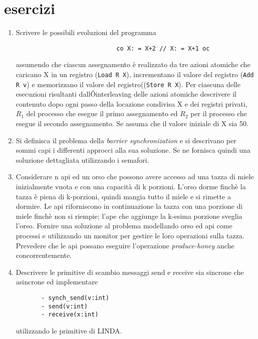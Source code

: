 \chapter{esercizi}

\begin{enumerate}
\medskip
\item 
Scrivere le possibili evoluzioni del programma 
\begin{verbatim}
                       		co X: = X+2 // X: = X+1 oc
\end{verbatim}
assumendo che ciascun assegnamento è realizzato da tre azioni atomiche che
caricano X in un registro (\verb"Load R X"), incrementano il valore del registro (\verb"Add R v") e memorizzano il valore del registro((\verb"Store R X"). Per ciascuna delle esecuzioni risultanti dallÕinterleaving delle azioni atomiche descrivere il contenuto dopo ogni passo della locazione condivisa X e dei registri privati,  $R_1$ del processo che esegue il primo assegnamento ed  $R_2$  per il processo che esegue il secondo assegnamento. Se assuma che il valore iniziale di X sia 50.
\medskip
\item
Si definisca il problema della \emph{barrier synchronization} e si descrivano per sommi capi i differenti approcci alla sua soluzione. Se ne fornisca quindi una soluzione dettagliata utilizzando i semafori.
\medskip
\item
Considerare n api ed un orso che possono avere accesso ad una tazza di miele
inizialmente  vuota e con una capacità di k porzioni. L'orso dorme finchè la
tazza è piena di k-porzioni,  quindi mangia tutto il miele e si rimette a
dormire. Le api riforniscono in continuazione la  tazza con una porzione di
miele finchè non si riempie; l'ape che aggiunge la k-esima porzione sveglia
l'orso. Fornire una soluzione al problema modellando orso ed api come  processi
e utilizzando un monitor per gestire le loro operazioni sulla tazza. Prevedere che le api possano eseguire l'operazione \emph{produce-honey} anche concorrentemente.
 \medskip
 \item  Descrivere le primitive di scambio messaggi send e receive sia sincrone che asincrone ed implementare
 \vspace{-0.5cm}
 \begin{verbatim}
       - synch_send(v:int)
       - send(v:int)
       - receive(x:int)
\end{verbatim}
 \vspace{-0.3cm}
utilizzando le primitive di LINDA.

\end{enumerate}
